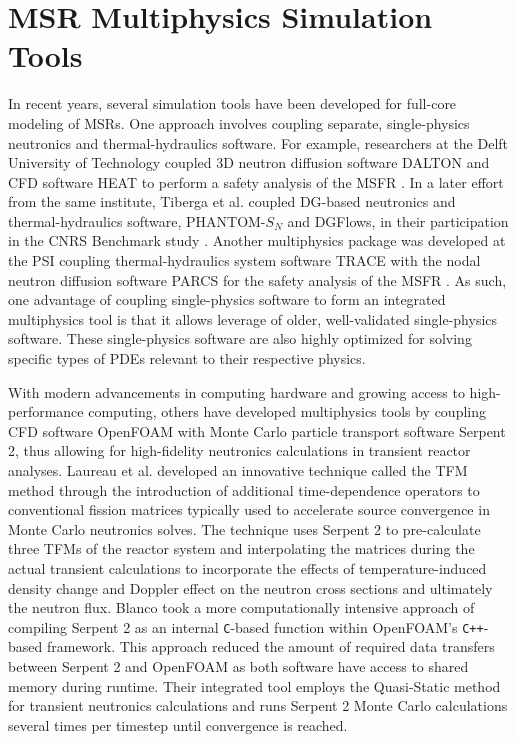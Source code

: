 \section{MSR Multiphysics Simulation Tools} \label{sec:msr-tools}

In recent years, several simulation tools have been developed for full-core
modeling of \glspl{MSR}. One approach involves coupling separate,
single-physics neutronics and thermal-hydraulics software. For example,
researchers at the Delft University of Technology coupled 3D neutron diffusion
software DALTON \cite{boer_validation_2010} and CFD software HEAT
\cite{de_zwaan_static_2007} to perform a safety analysis of the \gls{MSFR}
\cite{fiorina_modelling_2014}. In a later effort from the same institute,
Tiberga et al. \cite{tiberga_discontinuous_2019} coupled \gls{DG}-based
neutronics and thermal-hydraulics software, PHANTOM-$S_N$
and DGFlows, in their participation in the \gls{CNRS} Benchmark study
\cite{tiberga_results_2020}. Another multiphysics
package was developed at the \gls{PSI} coupling
thermal-hydraulics system software TRACE \cite{nrc_trace_2007} with the nodal
neutron diffusion software PARCS \cite{downar_parcs_2010} for the safety
analysis of the \gls{MSFR} \cite{pettersen_coupled_2016}. As such, one
advantage of coupling single-physics software to form an
integrated multiphysics tool is that it allows leverage of older,
well-validated single-physics software. These single-physics software are also
highly optimized for solving specific types of \glspl{PDE} relevant to their
respective physics.

With modern advancements in computing hardware and growing access to
high-performance computing, others have developed multiphysics tools by
coupling CFD software
OpenFOAM with Monte Carlo particle transport software Serpent 2, thus allowing
for high-fidelity neutronics calculations in transient reactor analyses.
Laureau et al. \cite{laureau_transient_2017} developed an innovative technique
called the \gls{TFM} method through the introduction of additional
time-dependence operators to conventional fission matrices typically used to
accelerate source convergence in Monte Carlo neutronics solves. The technique
uses Serpent 2 to pre-calculate three \glspl{TFM} of the reactor system and
interpolating the matrices during the actual transient calculations to
incorporate the effects of temperature-induced density change and Doppler
effect on the neutron cross sections and ultimately the neutron flux. Blanco
\cite{blanco_neutronic_2020} took a more computationally intensive approach of
compiling Serpent 2 as an internal \texttt{C}-based function within OpenFOAM's
\texttt{C++}-based framework. This approach reduced the amount of required data
transfers between Serpent 2 and OpenFOAM as both software have access to shared
memory during runtime. Their integrated tool employs the Quasi-Static
method for transient neutronics calculations and runs Serpent 2 Monte Carlo
calculations several times per timestep until convergence is reached.

